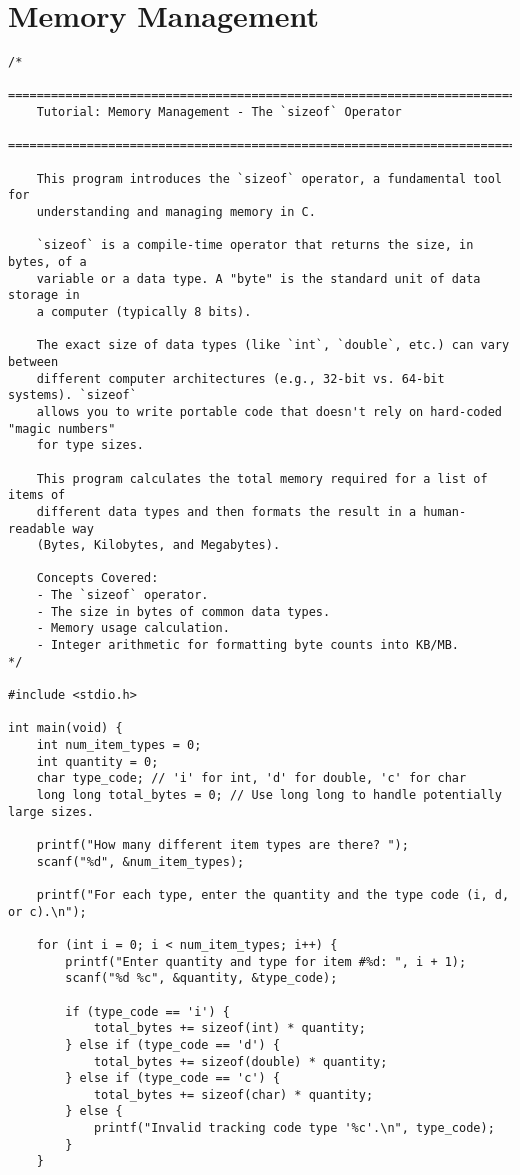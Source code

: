 \documentclass[11pt]{book}
\begin{document}
\chapter{Memory Management}
\clearpage
\begin{verbatim}
/*
    ================================================================================
    Tutorial: Memory Management - The `sizeof` Operator
    ================================================================================

    This program introduces the `sizeof` operator, a fundamental tool for
    understanding and managing memory in C.

    `sizeof` is a compile-time operator that returns the size, in bytes, of a
    variable or a data type. A "byte" is the standard unit of data storage in
    a computer (typically 8 bits).

    The exact size of data types (like `int`, `double`, etc.) can vary between
    different computer architectures (e.g., 32-bit vs. 64-bit systems). `sizeof`
    allows you to write portable code that doesn't rely on hard-coded "magic numbers"
    for type sizes.

    This program calculates the total memory required for a list of items of
    different data types and then formats the result in a human-readable way
    (Bytes, Kilobytes, and Megabytes).

    Concepts Covered:
    - The `sizeof` operator.
    - The size in bytes of common data types.
    - Memory usage calculation.
    - Integer arithmetic for formatting byte counts into KB/MB.
*/

#include <stdio.h>

int main(void) {
    int num_item_types = 0;
    int quantity = 0;
    char type_code; // 'i' for int, 'd' for double, 'c' for char
    long long total_bytes = 0; // Use long long to handle potentially large sizes.

    printf("How many different item types are there? ");
    scanf("%d", &num_item_types);

    printf("For each type, enter the quantity and the type code (i, d, or c).\n");

    for (int i = 0; i < num_item_types; i++) {
        printf("Enter quantity and type for item #%d: ", i + 1);
        scanf("%d %c", &quantity, &type_code);

        if (type_code == 'i') {
            total_bytes += sizeof(int) * quantity;
        } else if (type_code == 'd') {
            total_bytes += sizeof(double) * quantity;
        } else if (type_code == 'c') {
            total_bytes += sizeof(char) * quantity;
        } else {
            printf("Invalid tracking code type '%c'.\n", type_code);
        }
    }


\end{verbatim}
\end{document}
